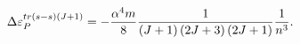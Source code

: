 \begin{equation}
\Delta \varepsilon _{P}^{tr\left( s-s\right) (J+1)}=-\frac{\alpha ^{4}m}{8}%
\frac{1}{\left( J+1\right) \left( 2J+3\right) \left( 2J+1\right) }\frac{1}{%
n^{3}}.
\end{equation}

